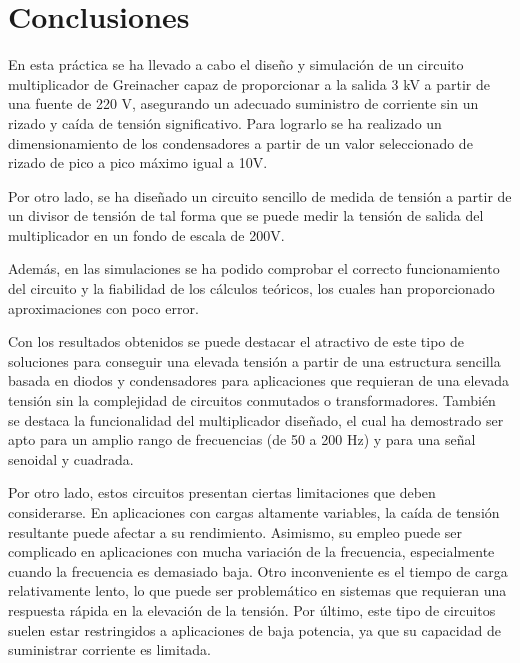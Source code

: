 \section{Conclusiones}

En esta práctica se ha llevado a cabo el diseño y simulación de un 
circuito multiplicador de Greinacher capaz de proporcionar a la salida 
3 kV a partir de una fuente de 220 V, asegurando un adecuado suministro de 
corriente sin un rizado y caída de tensión significativo. Para lograrlo se ha realizado 
un dimensionamiento de los condensadores a partir de un valor seleccionado de rizado de pico a 
pico máximo igual a 10V.

Por otro lado, se ha diseñado un circuito sencillo de medida de tensión a partir de un divisor 
de tensión de tal forma que se puede medir la tensión de salida del multiplicador en un fondo 
de escala de 200V.

Además, en las simulaciones se ha podido comprobar el correcto funcionamiento del circuito y la fiabilidad 
de los cálculos teóricos, los cuales han proporcionado aproximaciones con poco error.

Con los resultados obtenidos se puede destacar el atractivo de este tipo de soluciones para conseguir 
una elevada tensión a partir de una estructura sencilla basada en diodos y condensadores para aplicaciones 
que requieran de una elevada tensión sin la complejidad de circuitos conmutados o transformadores. También se 
destaca la funcionalidad del multiplicador diseñado, el cual ha demostrado ser apto para un amplio rango 
de frecuencias (de 50 a 200 Hz) y para una señal senoidal y cuadrada.

Por otro lado, estos circuitos presentan ciertas limitaciones que deben considerarse. En aplicaciones con 
cargas altamente variables, la caída de tensión resultante puede afectar a su rendimiento. Asimismo, su empleo puede 
ser complicado en aplicaciones 
con mucha variación de la frecuencia, especialmente cuando la frecuencia es demasiado baja. Otro inconveniente es el tiempo de carga relativamente lento, lo que puede 
ser problemático en sistemas que requieran una respuesta rápida en la elevación de la tensión. Por último, este tipo 
de circuitos suelen estar restringidos a aplicaciones de baja potencia, ya que su capacidad 
de suministrar corriente es limitada.

